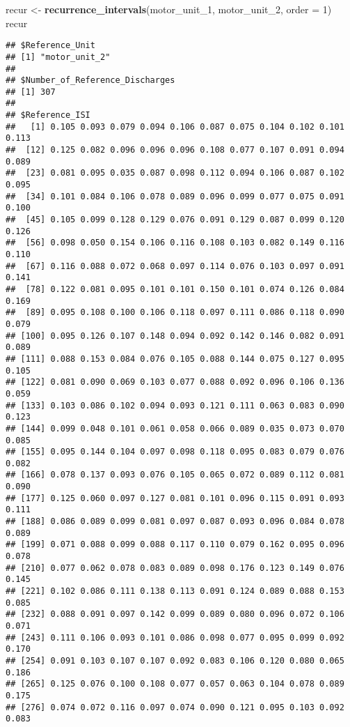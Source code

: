 \documentclass[]{article}
\newenvironment{Shaded}{\begin{snugshade}}{\end{snugshade}}
\newcommand{\KeywordTok}[1]{\textcolor[rgb]{0.13,0.29,0.53}{\textbf{#1}}}
\newcommand{\DataTypeTok}[1]{\textcolor[rgb]{0.13,0.29,0.53}{#1}}
\newcommand{\DecValTok}[1]{\textcolor[rgb]{0.00,0.00,0.81}{#1}}
\newcommand{\StringTok}[1]{\textcolor[rgb]{0.31,0.60,0.02}{#1}}
\newcommand{\NormalTok}[1]{#1}
\begin{document}
\begin{Shaded}
\begin{Highlighting}[]
\NormalTok{recur <-}\StringTok{ }\KeywordTok{recurrence_intervals}\NormalTok{(motor_unit_}\DecValTok{1}\NormalTok{, motor_unit_}\DecValTok{2}\NormalTok{, }\DataTypeTok{order =} \DecValTok{1}\NormalTok{)}
\NormalTok{recur}
\end{Highlighting}
\end{Shaded}

\begin{verbatim}
## $Reference_Unit
## [1] "motor_unit_2"
## 
## $Number_of_Reference_Discharges
## [1] 307
## 
## $Reference_ISI
##   [1] 0.105 0.093 0.079 0.094 0.106 0.087 0.075 0.104 0.102 0.101 0.113
##  [12] 0.125 0.082 0.096 0.096 0.096 0.108 0.077 0.107 0.091 0.094 0.089
##  [23] 0.081 0.095 0.035 0.087 0.098 0.112 0.094 0.106 0.087 0.102 0.095
##  [34] 0.101 0.084 0.106 0.078 0.089 0.096 0.099 0.077 0.075 0.091 0.100
##  [45] 0.105 0.099 0.128 0.129 0.076 0.091 0.129 0.087 0.099 0.120 0.126
##  [56] 0.098 0.050 0.154 0.106 0.116 0.108 0.103 0.082 0.149 0.116 0.110
##  [67] 0.116 0.088 0.072 0.068 0.097 0.114 0.076 0.103 0.097 0.091 0.141
##  [78] 0.122 0.081 0.095 0.101 0.101 0.150 0.101 0.074 0.126 0.084 0.169
##  [89] 0.095 0.108 0.100 0.106 0.118 0.097 0.111 0.086 0.118 0.090 0.079
## [100] 0.095 0.126 0.107 0.148 0.094 0.092 0.142 0.146 0.082 0.091 0.089
## [111] 0.088 0.153 0.084 0.076 0.105 0.088 0.144 0.075 0.127 0.095 0.105
## [122] 0.081 0.090 0.069 0.103 0.077 0.088 0.092 0.096 0.106 0.136 0.059
## [133] 0.103 0.086 0.102 0.094 0.093 0.121 0.111 0.063 0.083 0.090 0.123
## [144] 0.099 0.048 0.101 0.061 0.058 0.066 0.089 0.035 0.073 0.070 0.085
## [155] 0.095 0.144 0.104 0.097 0.098 0.118 0.095 0.083 0.079 0.076 0.082
## [166] 0.078 0.137 0.093 0.076 0.105 0.065 0.072 0.089 0.112 0.081 0.090
## [177] 0.125 0.060 0.097 0.127 0.081 0.101 0.096 0.115 0.091 0.093 0.111
## [188] 0.086 0.089 0.099 0.081 0.097 0.087 0.093 0.096 0.084 0.078 0.089
## [199] 0.071 0.088 0.099 0.088 0.117 0.110 0.079 0.162 0.095 0.096 0.078
## [210] 0.077 0.062 0.078 0.083 0.089 0.098 0.176 0.123 0.149 0.076 0.145
## [221] 0.102 0.086 0.111 0.138 0.113 0.091 0.124 0.089 0.088 0.153 0.085
## [232] 0.088 0.091 0.097 0.142 0.099 0.089 0.080 0.096 0.072 0.106 0.071
## [243] 0.111 0.106 0.093 0.101 0.086 0.098 0.077 0.095 0.099 0.092 0.170
## [254] 0.091 0.103 0.107 0.107 0.092 0.083 0.106 0.120 0.080 0.065 0.186
## [265] 0.125 0.076 0.100 0.108 0.077 0.057 0.063 0.104 0.078 0.089 0.175
## [276] 0.074 0.072 0.116 0.097 0.074 0.090 0.121 0.095 0.103 0.092 0.083

\end{verbatim}
\end{document}
